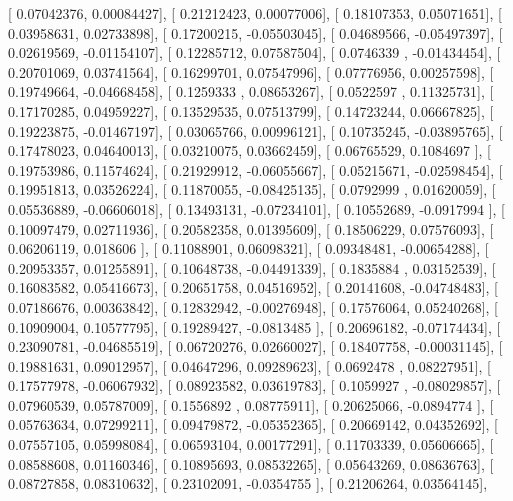 \documentclass{article}
\begin{document}
       [ 0.07042376,  0.00084427],
       [ 0.21212423,  0.00077006],
       [ 0.18107353,  0.05071651],
       [ 0.03958631,  0.02733898],
       [ 0.17200215, -0.05503045],
       [ 0.04689566, -0.05497397],
       [ 0.02619569, -0.01154107],
       [ 0.12285712,  0.07587504],
       [ 0.0746339 , -0.01434454],
       [ 0.20701069,  0.03741564],
       [ 0.16299701,  0.07547996],
       [ 0.07776956,  0.00257598],
       [ 0.19749664, -0.04668458],
       [ 0.1259333 ,  0.08653267],
       [ 0.0522597 ,  0.11325731],
       [ 0.17170285,  0.04959227],
       [ 0.13529535,  0.07513799],
       [ 0.14723244,  0.06667825],
       [ 0.19223875, -0.01467197],
       [ 0.03065766,  0.00996121],
       [ 0.10735245, -0.03895765],
       [ 0.17478023,  0.04640013],
       [ 0.03210075,  0.03662459],
       [ 0.06765529,  0.1084697 ],
       [ 0.19753986,  0.11574624],
       [ 0.21929912, -0.06055667],
       [ 0.05215671, -0.02598454],
       [ 0.19951813,  0.03526224],
       [ 0.11870055, -0.08425135],
       [ 0.0792999 ,  0.01620059],
       [ 0.05536889, -0.06606018],
       [ 0.13493131, -0.07234101],
       [ 0.10552689, -0.0917994 ],
       [ 0.10097479,  0.02711936],
       [ 0.20582358,  0.01395609],
       [ 0.18506229,  0.07576093],
       [ 0.06206119,  0.018606  ],
       [ 0.11088901,  0.06098321],
       [ 0.09348481, -0.00654288],
       [ 0.20953357,  0.01255891],
       [ 0.10648738, -0.04491339],
       [ 0.1835884 ,  0.03152539],
       [ 0.16083582,  0.05416673],
       [ 0.20651758,  0.04516952],
       [ 0.20141608, -0.04748483],
       [ 0.07186676,  0.00363842],
       [ 0.12832942, -0.00276948],
       [ 0.17576064,  0.05240268],
       [ 0.10909004,  0.10577795],
       [ 0.19289427, -0.0813485 ],
       [ 0.20696182, -0.07174434],
       [ 0.23090781, -0.04685519],
       [ 0.06720276,  0.02660027],
       [ 0.18407758, -0.00031145],
       [ 0.19881631,  0.09012957],
       [ 0.04647296,  0.09289623],
       [ 0.0692478 ,  0.08227951],
       [ 0.17577978, -0.06067932],
       [ 0.08923582,  0.03619783],
       [ 0.1059927 , -0.08029857],
       [ 0.07960539,  0.05787009],
       [ 0.1556892 ,  0.08775911],
       [ 0.20625066, -0.0894774 ],
       [ 0.05763634,  0.07299211],
       [ 0.09479872, -0.05352365],
       [ 0.20669142,  0.04352692],
       [ 0.07557105,  0.05998084],
       [ 0.06593104,  0.00177291],
       [ 0.11703339,  0.05606665],
       [ 0.08588608,  0.01160346],
       [ 0.10895693,  0.08532265],
       [ 0.05643269,  0.08636763],
       [ 0.08727858,  0.08310632],
       [ 0.23102091, -0.0354755 ],
       [ 0.21206264,  0.03564145],
\end{document}
